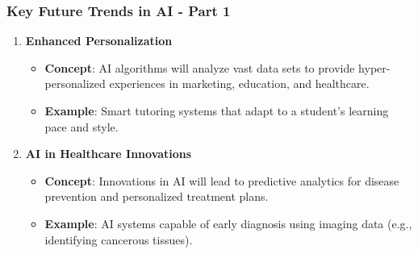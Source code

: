 \documentclass[aspectratio=169]{beamer}
\begin{document}
\begin{frame}[fragile]
    \frametitle{Key Future Trends in AI - Part 1}
    \begin{enumerate}
        \item \textbf{Enhanced Personalization}
        \begin{itemize}
            \item \textbf{Concept}: AI algorithms will analyze vast data sets to provide hyper-personalized experiences in marketing, education, and healthcare.
            \item \textbf{Example}: Smart tutoring systems that adapt to a student's learning pace and style.
        \end{itemize}
        
        \item \textbf{AI in Healthcare Innovations}
        \begin{itemize}
            \item \textbf{Concept}: Innovations in AI will lead to predictive analytics for disease prevention and personalized treatment plans.
            \item \textbf{Example}: AI systems capable of early diagnosis using imaging data (e.g., identifying cancerous tissues).
        \end{itemize}
    \end{enumerate}
\end{frame}
\end{document}
